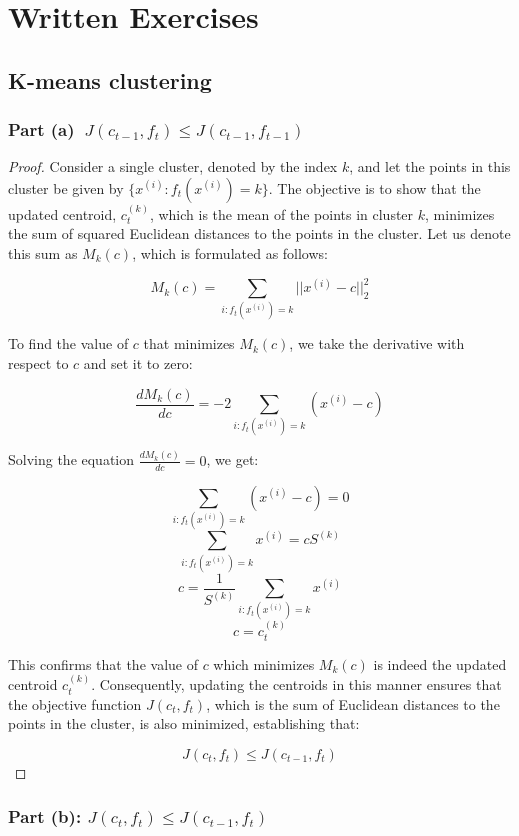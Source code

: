 \documentclass{article}
\begin{document}
\section{Written Exercises}

\subsection{K-means clustering}

\subsubsection*{Part (a) \(\ J(c_{t-1}, f_t) \le J(c_{t-1}, f_{t-1})\)}

\begin{proof}
Consider a single cluster, denoted by the index \(k\), and let the points in this cluster be given by \(\{x^{(i)}: f_t(x^{(i)}) = k\}\). The objective is to show that the updated centroid, \(c_t^{(k)}\), which is the mean of the points in cluster \(k\), minimizes the sum of squared Euclidean distances to the points in the cluster. Let us denote this sum as \(M_k(c)\), which is formulated as follows:

\[ M_k(c) = \sum_{i:f_t(x^{(i)}) = k} ||x^{(i)} - c||_2^2 \]

To find the value of \(c\) that minimizes \(M_k(c)\), we take the derivative with respect to \(c\) and set it to zero:

\[ \frac{dM_k(c)}{dc} = -2 \sum_{i:f_t(x^{(i)}) = k} (x^{(i)} - c) \]

Solving the equation \(\frac{dM_k(c)}{dc} = 0\), we get:

\[ \sum_{i:f_t(x^{(i)}) = k} (x^{(i)} - c) = 0 \]
\[ \sum_{i:f_t(x^{(i)}) = k} x^{(i)} = c S^{(k)} \]
\[ c = \frac{1}{S^{(k)}} \sum_{i:f_t(x^{(i)}) = k} x^{(i)} \]
\[ c = c_t^{(k)} \]

This confirms that the value of \(c\) which minimizes \(M_k(c)\) is indeed the updated centroid \(c_t^{(k)}\). Consequently, updating the centroids in this manner ensures that the objective function \(J(c_t, f_t)\), which is the sum of Euclidean distances to the points in the cluster, is also minimized, establishing that:

\[ J(c_t, f_t) \leq J(c_{t-1}, f_t) \]
\end{proof}

\subsubsection*{Part (b): \(J(c_t, f_t) \leq J(c_{t-1}, f_t)\)}
\end{document}
